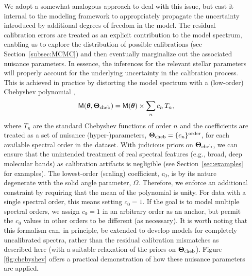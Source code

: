\documentclass[iop,floatfix]{emulateapj}
\newcommand{\vt}{ {\bm \theta}}
\newcommand{\vT}{ {\bm \Theta}}
\newcommand{\vM}{\mathsf{M}}
\begin{document}
We adopt a somewhat analogous approach to deal with this issue, but cast it internal to the 
modeling framework to appropriately propagate the uncertainty introduced by additional degrees of 
freedom in the model.  The residual calibration errors are treated as an explicit contribution to 
the model spectrum, enabling us to explore the distribution of possible calibrations (see 
Section~\ref{subsec:MCMC}) and then eventually marginalize out the associated nuisance parameters.  
In essence, the inferences for the relevant stellar parameters will properly account for the 
underlying uncertainty in the calibration process.  This is achieved in practice by distorting the 
model spectrum with a (low-order) Chebyshev polynomial \citep[e.g.,][]{eisenstein06,koleva09}, 
\begin{equation}
\vM(\vt, \vT_{\rm cheb}) = \vM(\vt) \times \sum_n c_n \, T_n,
\label{eqn:chebyshev}
\end{equation}
where $T_n$ are the standard Chebyshev functions of order $n$ and the coefficients are treated as a
set of nuisance (hyper-)parameters, $\vT_{\rm cheb} = \{c_n\}^{\rm order}$, for each available 
spectral order in the dataset.  With judicious priors on $\vT_{\rm cheb}$, we can ensure that the 
unintended treatment of real spectral features (e.g., broad, deep molecular bands) as calibration 
artifacts is negligible (see Section~\ref{sec:examples} for examples).  The lowest-order (scaling) 
coefficient, $c_0$, is by its nature degenerate with the solid angle parameter, $\Omega$.  
Therefore, we enforce an additional constraint by requiring that the mean of the polynomial is 
unity.  For data with a single spectral order, this means setting $c_0 = 1$.  If the goal is to 
model multiple spectral orders, we assign $c_0 = 1$ in an arbitrary order as an anchor, but permit 
the $c_0$ values in other orders to be different (as necessary).  It is worth noting that this 
formalism can, in principle, be extended to develop models for completely uncalibrated spectra, 
rather than the residual calibration mismatches as described here (with a suitable relaxation of 
the priors on $\vT_{\rm cheb}$).  Figure \ref{fig:chebyshev} offers a practical demonstration of how 
these nuisance parameters are applied. 
\end{document}
